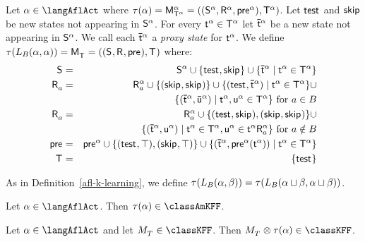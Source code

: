 \begin{definition}[Learning]\label{afl-kff-learning}
Let $\alpha \in \langAflAct$ where $\tau(\alpha) = \aPModel[\alpha]{\aStatesT[\alpha]} = \aPModelTuple[\alpha]{\aStatesT[\alpha]}$.
Let $\aStateTest$ and $\aStateSkip$ be new states not appearing in $\aStates[\alpha]$.
For every $\aStateT[\alpha] \in \aStatesT[\alpha]$ let $\aPStateT[\alpha]$ be a new state not appearing in $\aStates[\alpha]$.
We call each $\aPStateT[\alpha]$ a {\em proxy state} for $\aStateT[\alpha]$.
We define $\tau(\learnsBs (\alpha, \alpha)) = \aPModel{\aStatesT} = \aPModelTuple{\aStatesT}$ where:
\begin{eqnarray*}
    \aStates &=& \aStates[\alpha] \cup \{\aStateTest, \aStateSkip\} \cup \{\aPStateT[\alpha] \mid \aStateT[\alpha] \in \aStatesT[\alpha]\}\\
    \aAccessibility{\agentA} &=& \aAccessibility[\alpha]{\agentA} \cup \{(\aStateSkip, \aStateSkip)\} \cup \{(\aStateTest, \aPStateT[\alpha]) \mid \aStateT[\alpha] \in \aStatesT[\alpha]\} \cup \\&& \quad \{(\aPStateT[\alpha], \aPStateU[\alpha]) \mid \aStateT[\alpha], \aStateU[\alpha] \in \aStatesT[\alpha]\} \text{ for } \agentA \in \agentsB\\
    \aAccessibility{\agentA} &=& \aAccessibility[\alpha]{\agentA} \cup \{(\aStateTest, \aStateSkip), (\aStateSkip, \aStateSkip)\} \cup\\&& \quad \{(\aPStateT[\alpha], \aStateU[\alpha]) \mid \aStateT[\alpha] \in \aStatesT[\alpha], \aStateU[\alpha] \in \aStateT[\alpha] \aAccessibility[\alpha]{\agentA} \} \text{ for } \agentA \notin \agentsB\\
    \aPrecondition &=& \aPrecondition[\alpha] \cup \{(\aStateTest, \top), (\aStateSkip, \top)\} \cup \{(\aPStateT[\alpha], \aPrecondition[\alpha](\aStateT[\alpha])) \mid \aStateT[\alpha] \in \aStatesT[\alpha]\}\\
    \aStatesT &=& \{\aStateTest\}
\end{eqnarray*}

As in Definition~\ref{afl-k-learning}, we define $\tau(\learnsBs (\alpha, \beta)) = \tau(\learnsBs (\alpha \choice \beta, \alpha \choice \beta))$.
\end{definition}

\begin{lemma}\label{afl-kff-structure}
Let $\alpha \in \langAflAct$. Then $\tau(\alpha) \in \classAmKFF$.
\end{lemma}

\begin{lemma}\label{afl-kff-exec}
Let $\alpha \in \langAflAct$ and let $\kPModel{\kStatesT} \in \classKFF$.
Then $\kPModel{\kStatesT} \exec \tau(\alpha) \in \classKFF$.
\end{lemma}

